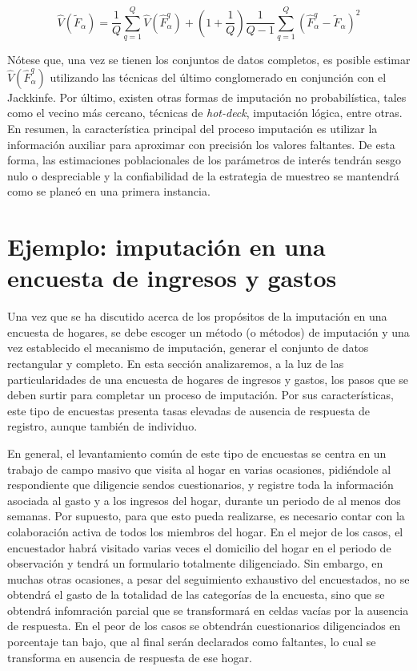 \documentclass[
  10pt,
  spanish,
]{book}
\begin{document}
\[
\hat{V}(\tilde{F}_{\alpha})
= \frac{1}{Q}\sum_{q=1}^Q \hat{V}(\hat{F}_{\alpha}^{q})
+ \left(1+\frac{1}{Q}\right)\frac{1}{Q-1}\sum_{q=1}^Q (\hat{F}_{\alpha}^{q}-\tilde{F}_{\alpha})^2
\]

Nótese que, una vez se tienen los conjuntos de datos completos, es posible estimar \(\hat{V}(\hat{F}_{\alpha}^{q})\) utilizando las técnicas del último conglomerado en conjunción con el Jackkinfe. Por último, existen otras formas de imputación no probabilística, tales como el vecino más cercano, técnicas de \emph{hot-deck}, imputación lógica, entre otras. En resumen, la característica principal del proceso imputación es utilizar la información auxiliar para aproximar con precisión los valores faltantes. De esta forma, las estimaciones poblacionales de los parámetros de interés tendrán sesgo nulo o despreciable y la confiabilidad de la estrategia de muestreo se mantendrá como se planeó en una primera instancia.

\hypertarget{ejemplo-imputaciuxf3n-en-una-encuesta-de-ingresos-y-gastos}{%
\section{Ejemplo: imputación en una encuesta de ingresos y gastos}\label{ejemplo-imputaciuxf3n-en-una-encuesta-de-ingresos-y-gastos}}

Una vez que se ha discutido acerca de los propósitos de la imputación en una encuesta de hogares, se debe escoger un método (o métodos) de imputación y una vez establecido el mecanismo de imputación, generar el conjunto de datos rectangular y completo. En esta sección analizaremos, a la luz de las particularidades de una encuesta de hogares de ingresos y gastos, los pasos que se deben surtir para completar un proceso de imputación. Por sus características, este tipo de encuestas presenta tasas elevadas de ausencia de respuesta de registro, aunque también de individuo.

En general, el levantamiento común de este tipo de encuestas se centra en un trabajo de campo masivo que visita al hogar en varias ocasiones, pidiéndole al respondiente que diligencie sendos cuestionarios, y registre toda la información asociada al gasto y a los ingresos del hogar, durante un periodo de al menos dos semanas. Por supuesto, para que esto pueda realizarse, es necesario contar con la colaboración activa de todos los miembros del hogar. En el mejor de los casos, el encuestador habrá visitado varias veces el domicilio del hogar en el periodo de observación y tendrá un formulario totalmente diligenciado. Sin embargo, en muchas otras ocasiones, a pesar del seguimiento exhaustivo del encuestados, no se obtendrá el gasto de la totalidad de las categorías de la encuesta, sino que se obtendrá infomración parcial que se transformará en celdas vacías por la ausencia de respuesta. En el peor de los casos se obtendrán cuestionarios diligenciados en porcentaje tan bajo, que al final serán declarados como faltantes, lo cual se transforma en ausencia de respuesta de ese hogar.
\end{document}
